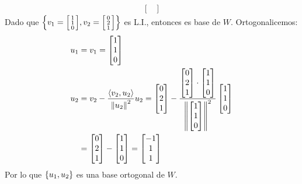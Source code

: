 \begin{solution}
\begin{align*}
{{\begin{bmatrix}
		\end{bmatrix}}
		}
	\end{align*}
	Dado que $\left\{ 
	v_{1} =\begin{bsmallmatrix}
		1 \\ 1 \\ 0
	\end{bsmallmatrix},
	v_{2} =\begin{bsmallmatrix}
		0 \\ 2 \\ 1
	\end{bsmallmatrix}
	 \right\}$ es L.I., entonces es base de $W$. Ortogonalicemos:
	\begin{align*}
		u_{1} &= v_{1} =
		\begin{bmatrix}
			1 \\ 1 \\ 0
		\end{bmatrix}\\
		u_{2} &= v_{2} - \dfrac{\left\langle v_{2}, u_{2} \right\rangle}{\left\Vert u_{2} \right\Vert^{2}}u_{2}
		=
		\begin{bmatrix}
			0 \\ 2 \\ 1
		\end{bmatrix}
		-
		\dfrac{
		\begin{bmatrix}
			0 \\ 2 \\ 1
		\end{bmatrix}
		\cdot
		\begin{bmatrix}
			1 \\ 1 \\ 0
		\end{bmatrix}
		}{\left\Vert 
		\begin{bmatrix}
			1 \\ 1 \\ 0
		\end{bmatrix}
		 \right\Vert^{2}}
		\begin{bmatrix}
			1 \\ 1 \\ 0
		\end{bmatrix}\\
		&=
		\begin{bmatrix}
			0 \\ 2 \\ 1
		\end{bmatrix}
		-
		\begin{bmatrix}
			1 \\ 1 \\ 0
		\end{bmatrix} 
		=
		\begin{bmatrix}
			-1 \\ 1 \\ 1
		\end{bmatrix}
	\end{align*}
	Por lo que $\left\{ u_{1}, u_{2} \right\}$ es una base ortogonal de $W$.
\end{solution}